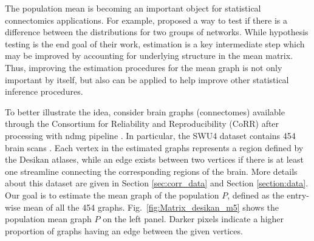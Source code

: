 \documentclass[journal,twoside,web]{ieeecolor}
\begin{document}
The population mean is becoming an important object for statistical connectomics applications.
For example, \cite{ginestet2014hypothesis} proposed a way to test if there is a difference between the distributions for two groups of networks.
While hypothesis testing is the end goal of their work, estimation is a key intermediate step which may be improved by accounting for underlying structure in the mean matrix.
Thus, improving the estimation procedures for the mean graph is not only important by itself, but also can be applied to help improve other statistical inference procedures.

To better illustrate the idea, consider  brain graphs (connectomes) available through the Consortium for Reliability and Reproducibility (CoRR) \cite{zuo2014open} after processing with ndmg pipeline \cite{kiar2017science, kiar2016ndmg}.
In particular, the SWU4 dataset contains 454 brain scans \cite{SWU4}.
Each vertex in the estimated graphs represents a region defined by the Desikan atlases, while an edge exists between two vertices if there is at least one streamline connecting the corresponding regions of the brain.
More details about this dataset are given in Section \ref{sec:corr_data} and Section \ref{section:data}.
Our goal is to estimate the mean graph of the population $P$, defined as the entry-wise mean of all the 454 graphs. Fig.~\ref{fig:Matrix_desikan_m5} shows the population mean graph $P$ on the left panel.
Darker pixels indicate a higher proportion of graphs having an edge between the given vertices.
\end{document}
